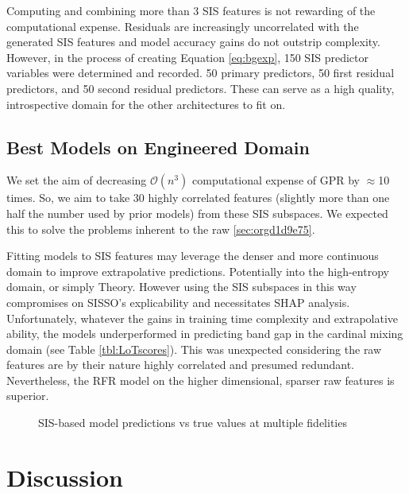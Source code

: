 Computing and combining more than 3 SIS features is not rewarding of the computational expense.
Residuals are increasingly uncorrelated with the generated SIS features and model accuracy gains do not outstrip complexity.
However, in the process of creating Equation \ref{eq:bgexp}, 150 SIS predictor variables were determined and recorded.
50 primary predictors, 50 first residual predictors, and 50 second residual predictors.
These can serve as a high quality, introspective domain for the other architectures to fit on.

\subsection{Best Models on Engineered Domain}
\label{sec:org3c8eaf2}
We set the aim of decreasing \(\mathcal{O}(n^3)\) computational expense of GPR by \(\approx\)10 times.
So, we aim to take 30 highly correlated features (slightly more than one half the number used by prior models) from these SIS subspaces.
We expected this to solve the problems inherent to the raw \ref{sec:orgd1d9e75}.

Fitting models to SIS features may leverage the denser and more continuous domain to improve extrapolative predictions.
Potentially into the high-entropy domain, or simply Theory.
However using the SIS subspaces in this way compromises on SISSO's explicability and necessitates SHAP analysis.
Unfortunately, whatever the gains in training time complexity and extrapolative ability, the models underperformed in predicting band gap in the cardinal mixing domain (see Table \ref{tbl:LoTscores}).
This was unexpected considering the raw features are by their nature highly correlated and presumed redundant.
Nevertheless, the RFR model on the higher dimensional, sparser raw features is superior.

 
\begin{figure}[htbp]
\centering

\caption{\label{fig:sis-pairplots} SIS-based model predictions vs true values at multiple fidelities}
\end{figure}

\section{Discussion}
\label{sec:org0359b0f}
